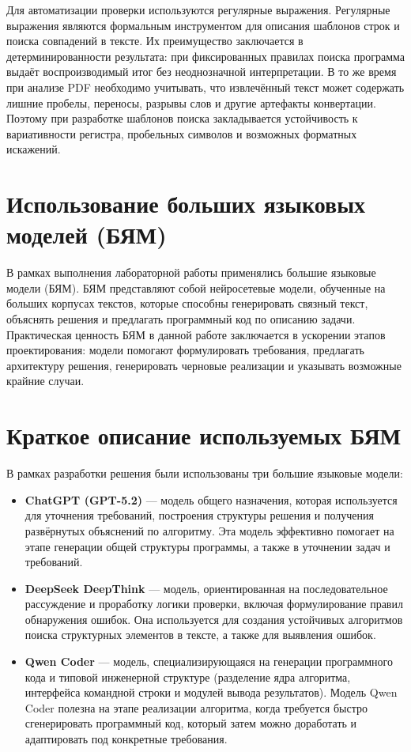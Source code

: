 Для автоматизации проверки используются регулярные выражения.
Регулярные выражения являются формальным инструментом для описания шаблонов строк и поиска совпадений в тексте.
Их преимущество заключается в детерминированности результата: при фиксированных правилах поиска
программа выдаёт воспроизводимый итог без неоднозначной интерпретации.
В то же время при анализе PDF необходимо учитывать, что извлечённый текст может содержать лишние пробелы,
переносы, разрывы слов и другие артефакты конвертации. Поэтому при разработке шаблонов поиска
закладывается устойчивость к вариативности регистра, пробельных символов и возможных форматных искажений.

\section{Использование больших языковых моделей (БЯМ)}

В рамках выполнения лабораторной работы применялись большие языковые модели (БЯМ).
БЯМ представляют собой нейросетевые модели, обученные на больших корпусах текстов,
которые способны генерировать связный текст, объяснять решения и предлагать программный код по описанию задачи.
Практическая ценность БЯМ в данной работе заключается в ускорении этапов проектирования:
модели помогают формулировать требования, предлагать архитектуру решения, генерировать черновые реализации
и указывать возможные крайние случаи.

\section{Краткое описание используемых БЯМ}

В рамках разработки решения были использованы три большие языковые модели:

\begin{itemize}
    \item \textbf{ChatGPT (GPT-5.2)} — модель общего назначения, которая используется для уточнения требований,
    построения структуры решения и получения развёрнутых объяснений по алгоритму.
    Эта модель эффективно помогает на этапе генерации общей структуры программы, а также в уточнении задач и требований.
    \item \textbf{DeepSeek DeepThink} — модель, ориентированная на последовательное рассуждение и
    проработку логики проверки, включая формулирование правил обнаружения ошибок.
    Она используется для создания устойчивых алгоритмов поиска структурных элементов в тексте, а также для выявления ошибок.
    \item \textbf{Qwen Coder} — модель, специализирующаяся на генерации программного кода и типовой инженерной структуре
    (разделение ядра алгоритма, интерфейса командной строки и модулей вывода результатов).
    Модель Qwen Coder полезна на этапе реализации алгоритма, когда требуется быстро сгенерировать программный код,
    который затем можно доработать и адаптировать под конкретные требования.
\end{itemize}

